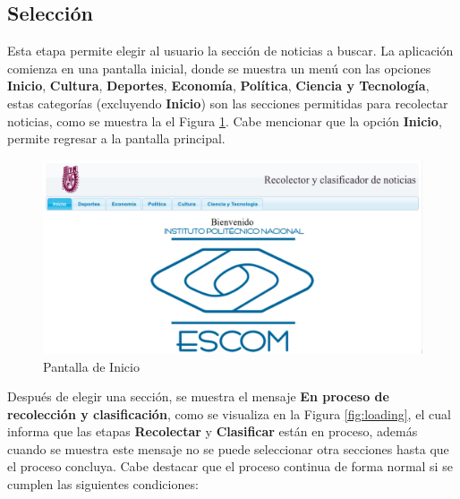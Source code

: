 %
%
%

\subsection{Selección}


Esta etapa permite elegir al usuario la sección de noticias a buscar. La aplicación comienza en una pantalla inicial, donde se muestra un menú con las opciones \textbf{Inicio}, \textbf{Cultura}, \textbf{Deportes}, \textbf{Economía}, \textbf{Política}, \textbf{Ciencia y Tecnología}, estas categorías (excluyendo \textbf{Inicio}) son las secciones permitidas para recolectar noticias, como se muestra la el Figura \ref{fig:PantallaInicio}. Cabe mencionar que la opción \textbf{Inicio}, permite regresar a la pantalla principal.\\


\begin{figure}[H]
\centering
\includegraphics[scale=0.29]{imagenes/Capitulo5/pantallaPrincipal.png}
\caption{Pantalla de Inicio}
\label{fig:PantallaInicio}
\end{figure}

Después de elegir una sección, se muestra el mensaje \textbf{En proceso de recolección y clasificación}, como se visualiza en la Figura \ref{fig:loading}, el cual informa que las etapas \textbf{Recolectar} y \textbf{Clasificar} están en proceso, además cuando se muestra este mensaje no se puede seleccionar otra secciones hasta que el proceso concluya. Cabe destacar que el proceso continua de forma normal si se cumplen las siguientes condiciones:

